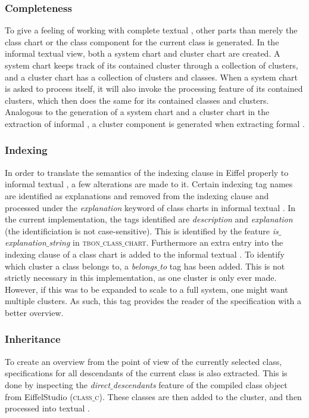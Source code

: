 \subsubsection{Completeness}
To give a feeling of working with complete textual \bon{}, other parts than merely the class chart or the class component for the current class is generated. In the informal textual \bon{} view, both a system chart and cluster chart are created. A system chart keeps track of its contained cluster through a collection of clusters, and a cluster chart has a collection of clusters and classes. When a system chart is asked to process itself, it will also invoke the processing feature of its contained clusters, which then does the same for its contained classes and clusters. Analogous to the generation of a system chart and a cluster chart in the extraction of informal \bon{}, a cluster component is generated when extracting formal \bon{}.

\subsubsection{Indexing}
In order to translate the semantics of the indexing clause in Eiffel properly to informal textual \bon{}, a few alterations are made to it. Certain indexing tag names are identified as explanations and removed from the indexing clause and processed under the \textit{explanation} keyword of class charts in informal textual \bon{}. In the current implementation, the tags identified are \textit{description} and \textit{explanation} (the identificiation is not case-sensitive). This is identified by the feature \textit{is$\_$explanation$\_$string} in \textsc{tbon$\_$class$\_$chart}. Furthermore an extra entry into the indexing clause of a class chart is added to the informal textual \bon{}. To identify which cluster a class belongs to, a \textit{belongs$\_$to} tag has been added. This is not strictly necessary in this implementation, as one cluster is only ever made. However, if this was to be expanded to scale to a full system, one might want multiple clusters. As such, this tag provides the reader of the specification with a better overview.

\subsubsection{Inheritance}
To create an overview from the point of view of the currently selected class, specifications for all descendants of the current class is also extracted. This is done by inspecting the \textit{direct$\_$descendants} feature of the compiled class object from EiffelStudio (\textsc{class$\_$c}). These classes are then added to the cluster, and then processed into textual \bon{}.

